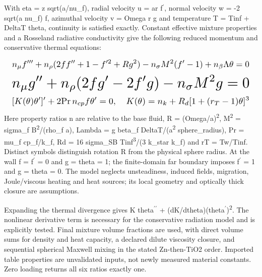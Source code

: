 \documentclass[10pt,letterpaper,twocolumn]{article}
\begin{document}
With eta = z sqrt(a/\allowbreak{}nu\_\allowbreak{}f), radial velocity u = ar f\ensuremath{^{\prime}}, normal velocity w = -2 sqrt(a nu\_\allowbreak{}f) f, azimuthal velocity v = Omega r g and temperature T = Tinf + DeltaT theta, continuity is satisfied exactly. Constant effective mixture properties and a Rosseland radiative conductivity give the following reduced momentum and conservative thermal equations:

\begin{equation}
\resizebox{.98\columnwidth}{!}{$\displaystyle n_\mu f'''+n_\rho(2ff''+1-f'^2+R g^2)-n_\sigma M^2(f'-1)+n_\beta\Lambda\theta=0$}
\end{equation}
\begin{equation}
\resizebox{.98\columnwidth}{!}{$\displaystyle n_\mu g''+n_\rho(2fg'-2f'g)-n_\sigma M^2g=0$}
\end{equation}
\begin{equation}
\resizebox{.98\columnwidth}{!}{$\displaystyle [K(\theta)\theta']'+2\mathrm{Pr}\,n_{cp}f\theta'=0,\quad K(\theta)=n_k+R_d[1+(r_T-1)\theta]^3$}
\end{equation}
Here property ratios n are relative to the base fluid, R = (Omega/\allowbreak{}a)\textsuperscript{2}, M\textsuperscript{2} = sigma\_\allowbreak{}f B\textsuperscript{2}/\allowbreak{}(rho\_\allowbreak{}f a), Lambda = g beta\_\allowbreak{}f DeltaT/\allowbreak{}(a\textsuperscript{2} sphere\_\allowbreak{}radius), Pr = mu\_\allowbreak{}f cp\_\allowbreak{}f/\allowbreak{}k\_\allowbreak{}f, Rd = 16 sigma\_\allowbreak{}SB Tinf\textsuperscript{3}/\allowbreak{}(3 k\_\allowbreak{}star k\_\allowbreak{}f) and rT = Tw/\allowbreak{}Tinf. Distinct symbols distinguish rotation R from the physical sphere radius. At the wall f = f\ensuremath{^{\prime}} = 0 and g = theta = 1; the finite-domain far boundary imposes f\ensuremath{^{\prime}} = 1 and g = theta = 0. The model neglects unsteadiness, induced fields, migration, Joule/\allowbreak{}viscous heating and heat sources; its local geometry and optically thick closure are assumptions.

Expanding the thermal divergence gives K theta\ensuremath{^{\prime\prime}} + (dK/\allowbreak{}dtheta)(theta\ensuremath{^{\prime}})\textsuperscript{2}. The nonlinear derivative term is necessary for the conservative radiation model and is explicitly tested. Final mixture volume fractions are used, with direct volume sums for density and heat capacity, a declared dilute viscosity closure, and sequential spherical Maxwell mixing in the stated Zn-then-TiO2 order. Imported table properties are unvalidated inputs, not newly measured material constants. Zero loading returns all six ratios exactly one.
\end{document}
